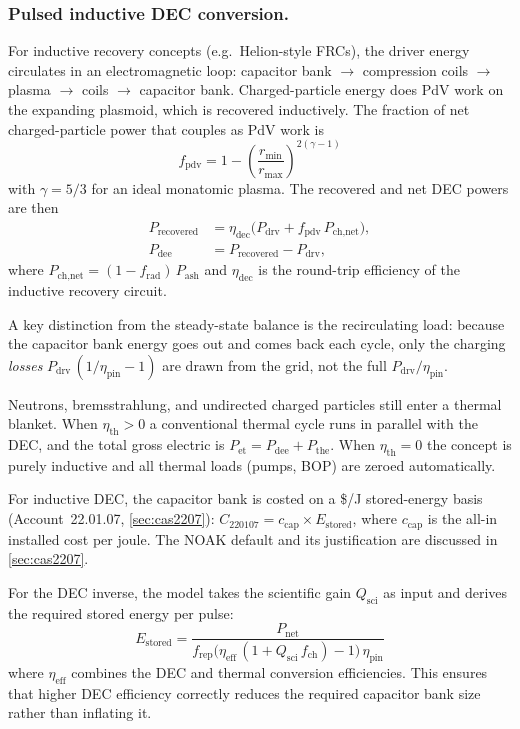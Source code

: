 \documentclass{article}
\begin{document}
\subsubsection{Pulsed inductive DEC conversion.}
For inductive recovery concepts (e.g.\ Helion-style FRCs), the driver
energy circulates in an electromagnetic loop: capacitor bank $\to$
compression coils $\to$ plasma $\to$ coils $\to$ capacitor bank.
Charged-particle energy does PdV work on the expanding plasmoid,
which is recovered inductively.  The fraction of net charged-particle
power that couples as PdV work is
\begin{equation}
f_{\text{pdv}} = 1 - \left(\frac{r_{\min}}{r_{\max}}\right)^{\!2(\gamma-1)}
\end{equation}
with $\gamma = 5/3$ for an ideal monatomic plasma.  The recovered and
net DEC powers are then
\begin{align}
P_{\text{recovered}} &= \eta_{\text{dec}} \bigl(P_{\text{drv}}
  + f_{\text{pdv}} \, P_{\text{ch,net}}\bigr), \\
P_{\text{dee}} &= P_{\text{recovered}} - P_{\text{drv}},
\end{align}
where $P_{\text{ch,net}} = (1 - f_{\text{rad}})\,P_{\text{ash}}$
and $\eta_{\text{dec}}$ is the round-trip efficiency of the
inductive recovery circuit.

A key distinction from the steady-state balance is the recirculating
load: because the capacitor bank energy goes out and comes back each
cycle, only the charging \emph{losses}
$P_{\text{drv}}\,(1/\eta_{\text{pin}} - 1)$ are drawn from the grid,
not the full $P_{\text{drv}}/\eta_{\text{pin}}$.

Neutrons, bremsstrahlung, and undirected charged particles still enter
a thermal blanket.  When $\eta_{\text{th}} > 0$ a conventional thermal
cycle runs in parallel with the DEC, and the total gross electric is
$P_{\text{et}} = P_{\text{dee}} + P_{\text{the}}$.  When
$\eta_{\text{th}} = 0$ the concept is purely inductive and all
thermal loads (pumps, BOP) are zeroed automatically.

For inductive DEC, the capacitor bank is costed on a \$/J stored-energy
basis (Account~22.01.07, \cref{sec:cas2207}): $C_{220107} = c_{\text{cap}}
\times E_{\text{stored}}$, where $c_{\text{cap}}$ is the all-in installed
cost per joule.  The NOAK default and its justification are discussed in
\cref{sec:cas2207}.

For the DEC inverse, the model takes the scientific gain $Q_{\text{sci}}$
as input and derives the required stored energy per pulse:
\begin{equation}
E_{\text{stored}} = \frac{P_{\text{net}}}{f_{\text{rep}} \bigl(
  \eta_{\text{eff}}\,(1 + Q_{\text{sci}}\,f_{\text{ch}}) - 1 \bigr)
  \,\eta_{\text{pin}}}
\end{equation}
where $\eta_{\text{eff}}$ combines the DEC and thermal conversion
efficiencies.  This ensures that higher DEC efficiency correctly reduces
the required capacitor bank size rather than inflating it.
\end{document}
